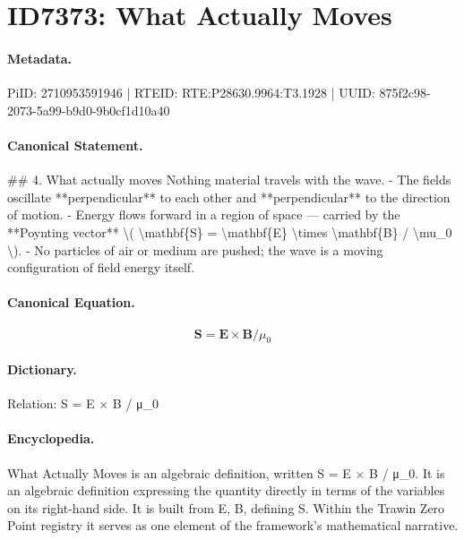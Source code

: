 \section*{ID7373: What Actually Moves}
\paragraph{Metadata.}
PiID: 2710953591946 | RTEID: RTE:P28630.9964:T3.1928 | UUID: 875f2c98-2073-5a99-b9d0-9b0cf1d10a40

\paragraph{Canonical Statement.}
\#\# 4. What actually moves Nothing material travels with the wave. - The fields oscillate **perpendicular** to each other and **perpendicular** to the direction of motion. - Energy flows forward in a region of space — carried by the **Poynting vector** \textbackslash{}( \textbackslash{}mathbf\{S\} = \textbackslash{}mathbf\{E\} \textbackslash{}times \textbackslash{}mathbf\{B\} / \textbackslash{}mu\_0 \textbackslash{}). - No particles of air or medium are pushed; the wave is a moving configuration of field energy itself.

\paragraph{Canonical Equation.}
\[
\mathbf{S} = \mathbf{E} \times \mathbf{B} / \mu_0
\]

\paragraph{Dictionary.}
Relation: S = E × B / μ\_0

\paragraph{Encyclopedia.}
What Actually Moves is an algebraic definition, written S = E × B / μ\_0. It is an algebraic definition expressing the quantity directly in terms of the variables on its right-hand side. It is built from E, B, defining S. Within the Trawin Zero Point registry it serves as one element of the framework's mathematical narrative.

